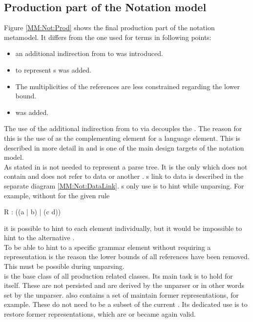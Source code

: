 \subsection{Production part of the Notation model}
Figure \ref{MM:Not:Prod} shows the final production part of the notation metamodel. It differs from the one used for terms in following points:
\begin{itemize}
	\item an additional indirection from  to  was introduced. 
	\item {} to represent s was added.
	\item The multiplicities of the references are less constrained regarding the lower bound.
	\item {} was added.
\end{itemize}
The use of the additional indirection from  to  via  decouples the . The reason for this is the use of  as the complementing element for a language element. This is described in more detail in  and is one of the main design targets of the notation model.\\
As stated in   is not needed to represent a parse tree. It is the only  which does not contain and does not refer to data or another . s link to data is described in the separate diagram \ref{MM:Not:DataLink}. s only use is to hint while unparsing. For example, without  for the given rule
\begin{xtxt}
R : ((a | b) | (c d)) 
\end{xtxt}
it is possible to hint to each element individually, but it would be impossible to hint to the alternative . \\
To be able to hint to a specific grammar element without requiring a representation is the reason the lower bounds of all references have been removed. This must be possible during unparsing.\\
 is the base class of all production related classes. Its main task is to hold  for itself. These  are not persisted and are derived by the unparser or in other words set by the unparser.  also contains a set of  maintain former representations, for example. These do not need to be a subset of the current . Its dedicated use is to restore former representations, which are or became again valid.

